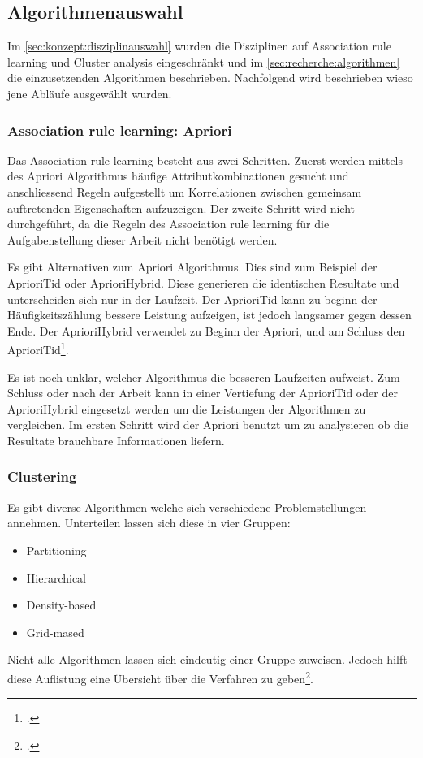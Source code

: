 \subsection{Algorithmenauswahl}
\label{sec:konzept:algorithmenauswahl}
Im \cref{sec:konzept:disziplinauswahl} wurden die Disziplinen auf Association rule learning und Cluster analysis eingeschränkt und im \cref{sec:recherche:algorithmen} die einzusetzenden Algorithmen beschrieben. Nachfolgend wird beschrieben wieso jene Abläufe ausgewählt wurden.

\subsubsection{Association rule learning: Apriori}
Das Association rule learning besteht aus zwei Schritten. Zuerst werden mittels des Apriori Algorithmus häufige Attributkombinationen gesucht und anschliessend Regeln aufgestellt um Korrelationen zwischen gemeinsam auftretenden Eigenschaften aufzuzeigen.
Der zweite Schritt wird nicht durchgeführt, da die Regeln des Association rule learning für die Aufgabenstellung dieser Arbeit nicht benötigt werden.

Es gibt Alternativen zum Apriori Algorithmus. Dies sind zum Beispiel der AprioriTid oder AprioriHybrid. Diese generieren die identischen Resultate und unterscheiden sich nur in der Laufzeit. Der AprioriTid kann zu beginn der Häufigkeitszählung bessere Leistung aufzeigen, ist jedoch langsamer gegen dessen Ende. Der AprioriHybrid verwendet zu Beginn der Apriori, und am Schluss den AprioriTid\footcite{association_rule_learning_2017-01-05}. 

Es ist noch unklar, welcher Algorithmus die besseren Laufzeiten aufweist. Zum Schluss oder nach der Arbeit kann in einer Vertiefung der AprioriTid oder der AprioriHybrid eingesetzt werden um die Leistungen der Algorithmen zu vergleichen. Im ersten Schritt wird der Apriori benutzt um zu analysieren ob die Resultate brauchbare Informationen liefern.

\subsubsection{Clustering}
\label{sec:konzept:algorithmenauswahl:clustering}
Es gibt diverse Algorithmen welche sich verschiedene Problemstellungen annehmen. Unterteilen lassen sich diese in vier Gruppen:
\begin{itemize}
	\item Partitioning
	\item Hierarchical
	\item Density-based
	\item Grid-mased
\end{itemize}
Nicht alle Algorithmen lassen sich eindeutig einer Gruppe zuweisen. Jedoch hilft diese Auflistung eine Übersicht über die Verfahren zu geben\footcite{data_mining_concepts_and_techniques}.

